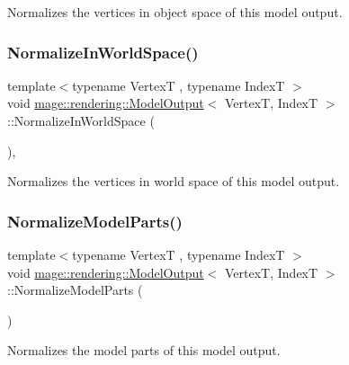 Normalizes the vertices in object space of this model output. \mbox{\label{structmage_1_1rendering_1_1_model_output_aa0bdaad37789cf846a9e11bfba0f4bff}} 
\subsubsection{\texorpdfstring{Normalize\+In\+World\+Space()}{NormalizeInWorldSpace()}}
{\footnotesize\ttfamily template$<$typename VertexT , typename IndexT $>$ \\
void \mbox{\hyperlink{structmage_1_1rendering_1_1_model_output}{mage\+::rendering\+::\+Model\+Output}}$<$ VertexT, IndexT $>$\+::Normalize\+In\+World\+Space (\begin{DoxyParamCaption}{ }\end{DoxyParamCaption})\hspace{0.3cm}{\ttfamily [private]}, {\ttfamily [noexcept]}}

Normalizes the vertices in world space of this model output. \mbox{\label{structmage_1_1rendering_1_1_model_output_aa94d284f71956ce69807916ff808d679}} 
\subsubsection{\texorpdfstring{Normalize\+Model\+Parts()}{NormalizeModelParts()}}
{\footnotesize\ttfamily template$<$typename VertexT , typename IndexT $>$ \\
void \mbox{\hyperlink{structmage_1_1rendering_1_1_model_output}{mage\+::rendering\+::\+Model\+Output}}$<$ VertexT, IndexT $>$\+::Normalize\+Model\+Parts (\begin{DoxyParamCaption}{ }\end{DoxyParamCaption})\hspace{0.3cm}{\ttfamily [noexcept]}}

Normalizes the model parts of this model output. 

